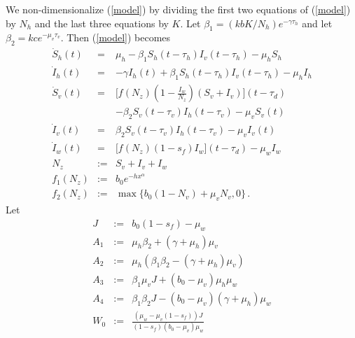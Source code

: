 \documentclass[12pt,leqno]{article}
\newcommand{\brn}{\mathcal{R}_0}
\begin{document}
We non-dimensionalize (\ref{model}) by dividing the first two equations of (\ref{model}) by $N_h$ and the last three equations by $K$. Let $\beta_1 = (kbK/N_h)e^{-\gamma\tau_h}$ and let $\beta_2 = kce^{-\mu_v\tau_v}$. Then (\ref{model}) becomes
\begin{eqnarray}\label{models}
\dot{S}_h(t) &=&  \mu_h - \beta_1 S_h(t-\tau_h)  I_v(t-\tau_h) - \mu_hS_h\nonumber\\
\dot{I}_h(t) &=& -\gamma I_h(t) + \beta_1 S_h(t-\tau_h)I_v(t-\tau_h) - \mu_h I_h\nonumber\\
\dot{S}_v(t) &=& \Big[f(N_z)\left(1 - \frac{I_w}{N_z}\right)(S_v+I_v)\Big](t-\tau_d)\nonumber \\
& & - \beta_2 S_v(t-\tau_v)I_h(t-\tau_v) - \mu_v S_v(t)\label{modelu}\nonumber \\
\dot{I}_v(t) &=& \beta_2 S_v(t-\tau_v)I_h(t-\tau_v) - \mu_v I_v(t)\nonumber\\
\dot{I}_w(t) &=& \big[f(N_z)(1-s_f)I_w\big](t-\tau_d) - \mu_w I_w\nonumber\\
N_z &:=& S_v + I_v + I_w\nonumber\\
f_1(N_z) &:=& b_0e^{-hx^{\alpha}}\nonumber \\
f_2(N_z) &:=& \max\{b_0(1-N_v) + \mu_vN_v,0\}\nonumber\,.
\end{eqnarray}
Let
\begin{eqnarray*}
J &:=& b_0(1-s_f) - \mu_w\\
A_1 &:=& \mu_h\beta_2 + (\gamma + \mu_h)\mu_v\\
A_2 &:=& \mu_h(\beta_1\beta_2 - (\gamma +\mu_h)\mu_v)\\
A_3 %
&:=& \beta_1\mu_vJ + (b_0-\mu_v)\mu_h\mu_w\\
A_4 %
&:=& \beta_1\beta_2 J - (b_0-\mu_v)(\gamma+\mu_h)\mu_w\\
W_0 &:=& \frac{(\mu_w-\mu_v(1-s_f))J}{(1-s_f)(b_0-\mu_v)\mu_w}
\end{eqnarray*}
\end{document}
